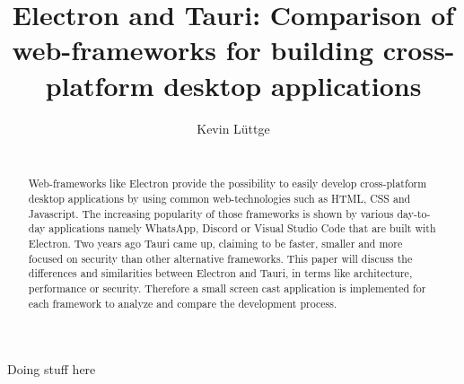 \documentclass{acm_proc_article-sp}
\date{\displaydate{date}}
\begin{document}
    \title{{\ttlit Electron} and {\ttlit Tauri}: Comparison of web-frameworks for building cross-platform desktop applications}
    \author{
        \alignauthor
        Kevin L\"uttge \\
        \\
    }

    \maketitle

    \begin{abstract}
        Web-frameworks like Electron provide the possibility to easily develop cross-platform desktop applications by using common web-technologies
        such as HTML, CSS and Javascript.
        The increasing popularity of those frameworks is shown by various day-to-day applications namely WhatsApp, Discord or Visual Studio Code
        that are built with Electron.
        Two years ago Tauri came up, claiming to be faster, smaller and more focused on security than other alternative frameworks.
        This paper will discuss the differences and similarities between Electron and Tauri, in terms like architecture, performance or security.
        Therefore a small screen cast application is implemented for each framework to analyze and compare the development process.
    \end{abstract}
    Doing stuff here
    
    
    
    
    
    

    \newpage

    
    

    \balancecolumns
\end{document}
